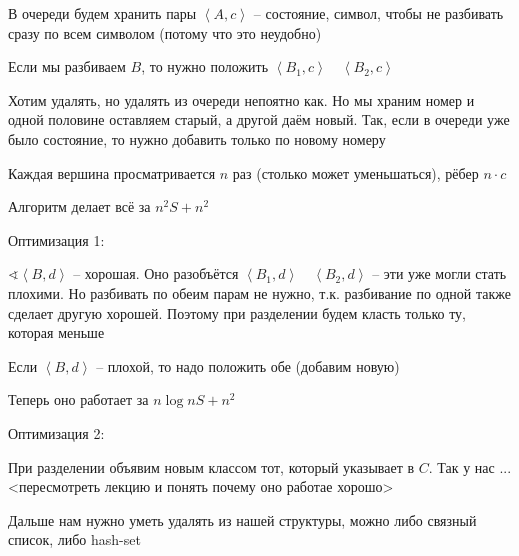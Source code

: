 \documentclass{book}
\theoremstyle{definition}
\begin{document}
В очереди будем хранить пары $\left<A,c \right>$ -- состояние, символ, чтобы не разбивать сразу по всем символом (потому что это неудобно)

Если мы разбиваем $B$, то нужно положить  $\left<B_1, c \right>\quad \left<B_2,c \right>$

Хотим удалять, но удалять из очереди непоятно как. Но мы храним номер и одной половине оставляем старый, а другой даём новый. Так, если в очереди уже было состояние, то нужно добавить только по новому номеру

Каждая вершина просматривается $n$ раз (столько может уменьшаться), рёбер  $n\cdot c$

Алгоритм делает всё за $n^2S + n^2$

Оптимизация 1:

 $\sphericalangle \left<B, d \right>$ -- хорошая. Оно разобъётся $\left<B_1,d \right>\quad \left<B_2,d \right>$ -- эти уже могли стать плохими. Но разбивать по обеим парам не нужно, т.к. разбивание по одной также сделает другую хорошей. Поэтому при разделении будем класть только ту, которая меньше

 Если $\left<B,d \right>$ -- плохой, то надо положить обе (добавим новую)

 Теперь оно работает за $n\log n S + n^2$

 Оптимизация 2:

 При разделении объявим новым классом тот, который указывает в $C$. Так у нас ... <пересмотреть лекцию и понять почему оно работае хорошо>

 Дальше нам нужно уметь удалять из нашей структуры, можно либо связный список, либо hash-set
\end{document}
